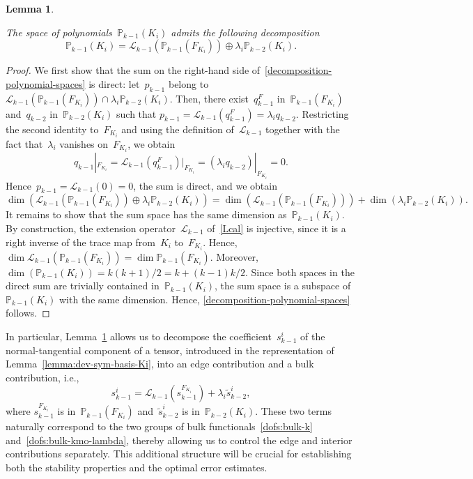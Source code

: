 \documentclass[a4paper,twoside,10pt]{article}
\theoremstyle{plain}
\newtheorem{lemma}[theorem]{Lemma}
\theoremstyle{remark}
\theoremstyle{definition}
\numberwithin{equation}{section}
\numberwithin{figure}{section}
\newcommand{\Pbbkmo}{\mathbb{P}_{k-1}}
\newcommand{\Pbbkmt}{\mathbb{P}_{k-2}}
\newcommand{\K}{K}
\newcommand{\F}{F}
\newcommand{\qkmo}{q_{k-1}}
\newcommand{\qkmt}{q_{k-2}}
\newcommand{\stildekmt}{\widetilde{s}_{k-2}}
\newcommand{\stildekmti}{\stildekmt^i}
\newcommand{\qkmoF}{q^\F_{k-1}}
\newcommand{\lambdai}{\lambda_i}
\newcommand{\skmoi}{s_{k-1}^i}
\newcommand{\Ki}{{\K_i}}
\newcommand{\Fi}{{\F_{\Ki}}}
\newcommand{\Lcalkmo}{\mathcal{L}_{k-1}}
\newcommand{\skmoFi}{s_{k-1}^{\Fi}}
\newcommand{\pkmo}{p_{k-1}}
\begin{document}
\begin{lemma} \label{lemma:decomposition-polynomial-spaces}

The space of polynomials~$\Pbbkmo(\Ki)$ admits the following decomposition
\begin{equation} \label{decomposition-polynomial-spaces}
\Pbbkmo(\Ki) = {\Lcalkmo(\Pbbkmo(\Fi))}\oplus\lambdai\Pbbkmt(\Ki).
\end{equation}
\end{lemma}
\begin{proof}
We first show that the sum on the right-hand side of~\eqref{decomposition-polynomial-spaces} is direct:
let~$\pkmo$ belong to
$\Lcalkmo(\Pbbkmo(\Fi))\cap\lambdai\Pbbkmt(\Ki)$.
Then,
there exist~$\qkmoF$ in~$\Pbbkmo(\Fi)$
and~$\qkmt$ in~$\Pbbkmt(\Ki)$ such that
$\pkmo = \Lcalkmo(\qkmoF) = \lambdai\qkmt$.
Restricting the second identity to~$\Fi$
and using the definition of~$\Lcalkmo$
together with the fact that~$\lambdai$ vanishes on~$\Fi$,
we obtain
\begin{equation*}
\qkmo|_\Fi  = \Lcalkmo(\qkmoF){|_\Fi} = (\lambdai\qkmt)|_\Fi = 0.
\end{equation*}
Hence~$\pkmo = \Lcalkmo(0) = 0$,
the sum is direct,
and we obtain
\begin{equation*}
\dim(\Lcalkmo(\Pbbkmo(\Fi))\oplus\lambdai\Pbbkmt(\Ki))
= \dim(\Lcalkmo(\Pbbkmo(\Fi)))+\dim(\lambdai\Pbbkmt(\Ki)).
\end{equation*}
It remains to show that the sum space has the same dimension as~$\Pbbkmo(\Ki)$. By construction,
the extension operator~$\Lcalkmo$ of~\eqref{Lcal}
is injective,
since it is a right inverse of the trace map from~$\Ki$ to~$\Fi$.
Hence,
$\dim\Lcalkmo(\Pbbkmo(\Fi)) = \dim\Pbbkmo(\Fi)$.
Moreover,
$
\dim(\Pbbkmo(\Ki))
= {k(k+1)}/{2}
= k + {(k-1)k}/{2}.
$
Since both spaces in the direct sum are trivially contained in~$\Pbbkmo(\Ki)$,
the sum space is a subspace of~$\Pbbkmo(\Ki)$ with the same dimension.
Hence,
\eqref{decomposition-polynomial-spaces} follows.
\end{proof}

In particular,
Lemma~\ref{lemma:decomposition-polynomial-spaces} allows us to decompose the coefficient~$\skmoi$ of the normal-tangential component of a tensor,
introduced in the representation of Lemma~\ref{lemma:dev-sym-basis-Ki},
into an edge contribution and a bulk contribution, i.e.,
\begin{equation*}
\skmoi = \Lcalkmo(\skmoFi) + \lambdai \stildekmti,
\end{equation*}
where $\skmoFi$ is in~$\Pbbkmo(\Fi)$ and~$\stildekmti$ is in~$\Pbbkmt(\Ki)$.
These two terms naturally correspond to
the two groups of bulk functionals~\eqref{dofs:bulk-k} and~\eqref{dofs:bulk-kmo-lambda},
thereby allowing us to control the edge and interior contributions separately.
This additional structure will be crucial
for establishing both the stability properties and the optimal error estimates.
\end{document}
